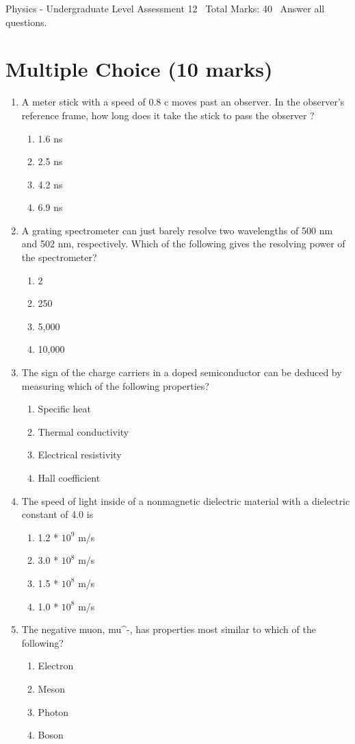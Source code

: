 \documentclass[12pt]{article}
\begin{document}
\begin{center}
Physics - Undergraduate Level Assessment 12 \
Total Marks: 40 \
Answer all questions.
\end{center}

\section*{Multiple Choice (10 marks)}
\begin{enumerate}[label=\arabic*.]
\item A meter stick with a speed of 0.8 c moves past an observer. In the observer's reference frame, how long does it take the stick to pass the observer ?
\begin{enumerate}[label=(\alph*)]
    \item 1.6 ns
    \item 2.5 ns
    \item 4.2 ns
    \item 6.9 ns
\end{enumerate}
\item A grating spectrometer can just barely resolve two wavelengths of 500 nm and 502 nm, respectively. Which of the following gives the resolving power of the spectrometer?
\begin{enumerate}[label=(\alph*)]
    \item 2
    \item 250
    \item 5,000
    \item 10,000
\end{enumerate}
\item The sign of the charge carriers in a doped semiconductor can be deduced by measuring which of the following properties?
\begin{enumerate}[label=(\alph*)]
    \item Specific heat
    \item Thermal conductivity
    \item Electrical resistivity
    \item Hall coefficient
\end{enumerate}
\item The speed of light inside of a nonmagnetic dielectric material with a dielectric constant of 4.0 is
\begin{enumerate}[label=(\alph*)]
    \item 1.2 * $10^9$ m/s
    \item 3.0 * $10^8$ m/s
    \item 1.5 * $10^8$ m/s
    \item 1.0 * $10^8$ m/s
\end{enumerate}
\item The negative muon, mu^-, has properties most similar to which of the following?
\begin{enumerate}[label=(\alph*)]
    \item Electron
    \item Meson
    \item Photon
    \item Boson
\end{enumerate}
\end{enumerate}
\end{document}
